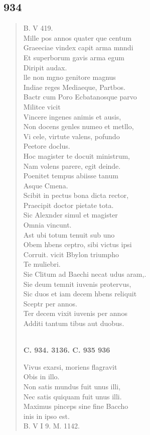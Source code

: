 \documentclass[11pt, a4paper]{report}
\begin{document}
            \subsection*{934}
      \begin{verse}
      B. V 419. \\ Mille pos annos quater que centum \\ Graeeciae vindex capit arma mnndi \\ Et superborum gavis arma egum \\ Diripit audax. \\ lle non mgno genitore magnus \\ Indiae reges Mediaeque, Partbos. \\ Bactr cum Poro Ecbatanosque parvo \\ Militce vicit \\ Vincere ingenes animis et ausis, \\ Non docens genles numeo et metllo, \\ Vi cele, virtute valens, pofundo \\ Peetore doclus. \\ Hoc magister te docuit ministrum, \\ Nam volens parere, egit deinde. \\ Poenitet tempus abiisse tanum \\ Asque Cmena. \\ Scibit in pectus bona dicta rector, \\ Praecipit doctor pietate tota. \\ Sic Alexnder simul et magister \\ Omnia vincunt. \\ Ast ubi totum tenuit sub uno \\ Obem hbens ceptro, sibi victus ipsi \\ Corruit. vicit Bbylon triumpho \\ Te muliebri. \\ Sie Clitum ad Baechi necat  \lbrack udus \rbrack  aram,. \\ Sie deum temnit iuvenis protervus, \\ Sic duos et iam decem hbens reliquit \\ Sceptr per annos. \\ Ter decem vixit iuvenis per annos \\ Additi tantum tibus aut duobus. \\ 
        ﻿\pagebreak 
    \begin{center} \textbf{C. 934. 3136. C. 935 936} \end{center} \marginpar{[359]} Vivus exarsi, moriens flagravit \\ Obis in illo. \\ Non satis mundus fuit unus illi, \\ Nec satis quiquam fuit unus illi. \\ Maximus pinceps sine fine Baccho \\ inis in ipso est. \\ B. V I 9. M. 1142. \\ 
      \end{verse}
  
\end{document}
